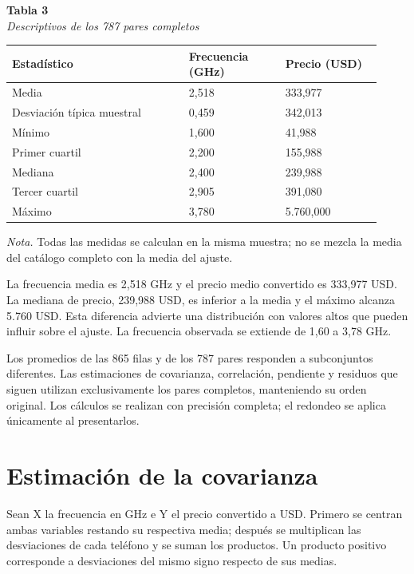 \documentclass[12pt,letterpaper]{article}
\begin{document}
\begin{center}\begin{minipage}{\linewidth}\textbf{Tabla 3}\\\textit{Descriptivos de los 787 pares completos}\\\begin{singlespace}\small
\begin{tabular}{@{}p{0.4402\linewidth}p{0.2415\linewidth}p{0.2415\linewidth}@{}}\toprule
\textbf{Estadístico} & \textbf{Frecuencia (GHz)} & \textbf{Precio (USD)}\\\midrule
Media & 2,518 & 333,977\\
Desviación típica muestral & 0,459 & 342,013\\
Mínimo & 1,600 & 41,988\\
Primer cuartil & 2,200 & 155,988\\
Mediana & 2,400 & 239,988\\
Tercer cuartil & 2,905 & 391,080\\
Máximo & 3,780 & 5.760,000\\
\bottomrule\end{tabular}\end{singlespace}
\small\textit{Nota.} Todas las medidas se calculan en la misma muestra; no se mezcla la media del catálogo completo con la media del ajuste.
\end{minipage}\end{center}
La frecuencia media es 2,518 GHz y el precio medio convertido es 333,977 USD. La mediana de precio, 239,988 USD, es inferior a la media y el máximo alcanza 5.760 USD. Esta diferencia advierte una distribución con valores altos que pueden influir sobre el ajuste. La frecuencia observada se extiende de 1,60 a 3,78 GHz.

Los promedios de las 865 filas y de los 787 pares responden a subconjuntos diferentes. Las estimaciones de covarianza, correlación, pendiente y residuos que siguen utilizan exclusivamente los pares completos, manteniendo su orden original. Los cálculos se realizan con precisión completa; el redondeo se aplica únicamente al presentarlos.

\clearpage
\section*{Estimación de la covarianza}
Sean X la frecuencia en GHz e Y el precio convertido a USD. Primero se centran ambas variables restando su respectiva media; después se multiplican las desviaciones de cada teléfono y se suman los productos. Un producto positivo corresponde a desviaciones del mismo signo respecto de sus medias.
\end{document}
